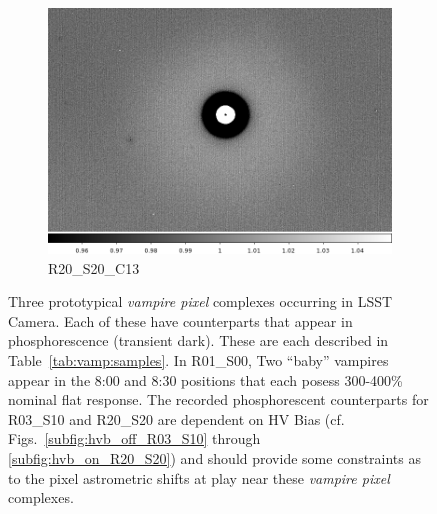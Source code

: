 \begin{figure}[!htbp]
\begin{subfigure}{0.3\textwidth}
     \includegraphics[width=\textwidth]{figures/vamp_desc/vamp_desc_ffresp_R20S20.png} 
     \caption{R20\_S20\_C13}
     \label{subfig:vamp_desc_R20_S20}
 \end{subfigure}  
 \newline
\caption{Three prototypical {\it vampire pixel} complexes occurring in LSST Camera. Each of these have counterparts that appear in phosphorescence (transient dark). These are each described in Table~\ref{tab:vamp:samples}. In R01\_S00, Two ``baby'' vampires appear in the 8:00 and 8:30 positions that each posess 300-400\% nominal flat response. The recorded phosphorescent counterparts for R03\_S10 and R20\_S20 are dependent on HV Bias (cf. Figs.~\ref{subfig:hvb_off_R03_S10} through \ref{subfig:hvb_on_R20_S20}) and should provide some constraints as to the pixel astrometric shifts at play near these {\it vampire pixel} complexes.}
\label{fig:vamp:ffresp}
\end{figure}



